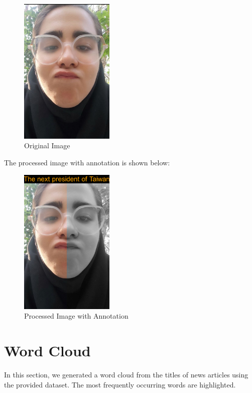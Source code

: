 \documentclass[12pt]{article}
\begin{document}
	\begin{figure}[H]
		\centering
		\includegraphics[width=0.4\textwidth]{ShowPic.png}
		\caption{Original Image}
	\end{figure}
	 		\newpage
	
	
	
	
	
	
	The processed image with annotation is shown below:
	\begin{figure}[H]
		\centering
		\includegraphics[width=0.4\textwidth]{processed_image.png}
		\caption{Processed Image with Annotation}
	\end{figure}
	
	\newpage
	\section{Word Cloud}
	In this section, we generated a word cloud from the titles of news articles using the provided dataset. The most frequently occurring words are highlighted.
\end{document}
